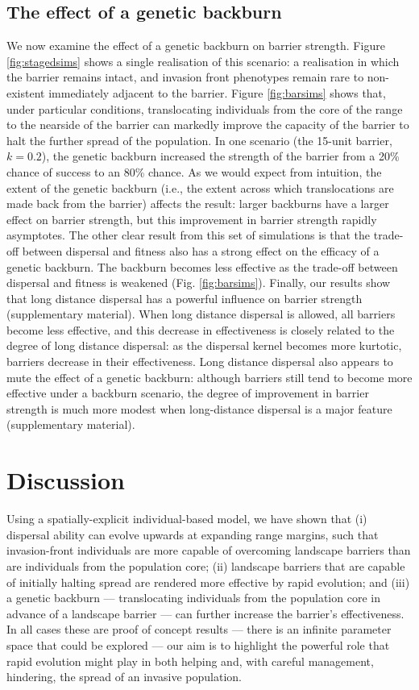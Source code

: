 \documentclass{article}
\begin{document}
\subsection{The effect of a genetic backburn}
We now examine the effect of a genetic backburn on barrier strength.  Figure \ref{fig:stagedsims} shows a single realisation of this scenario: a realisation in which the barrier remains intact, and invasion front phenotypes remain rare to non-existent immediately adjacent to the barrier.  Figure \ref{fig:barsims} shows that, under particular conditions, translocating individuals from the core of the range to the nearside of the barrier can markedly improve the capacity of the barrier to halt the further spread of the population. In one scenario (the 15-unit barrier, $k=0.2$), the genetic backburn increased the strength of the barrier from a 20\% chance of success to an 80\% chance.  As we would expect from intuition, the extent of the genetic backburn (i.e., the extent across which translocations are made back from the barrier) affects the result: larger backburns have a larger effect on barrier strength, but this improvement in barrier strength rapidly asymptotes.  The other clear result from this set of simulations is that the trade-off between dispersal and fitness also has a strong effect on the efficacy of a genetic backburn.  The backburn becomes less effective as the trade-off between dispersal and fitness is weakened (Fig. \ref{fig:barsims}).  Finally, our results show that long distance dispersal has a powerful influence on barrier strength (supplementary material).  When long distance dispersal is allowed, all barriers become less effective, and this decrease in effectiveness is closely related to the degree of long distance dispersal: as the dispersal kernel becomes more kurtotic, barriers decrease in their effectiveness.  Long distance dispersal also appears to mute the effect of a genetic backburn: although barriers still tend to become more effective under a backburn scenario, the degree of improvement in barrier strength is much more modest when long-distance dispersal is a major feature (supplementary material).

\section{Discussion}

Using a spatially-explicit individual-based model, we have shown that (i) dispersal ability can evolve upwards at expanding range margins, such that invasion-front individuals are more capable of overcoming landscape barriers than are individuals from the population core; (ii) landscape barriers that are capable of initially halting spread are rendered more effective by rapid evolution; and (iii) a genetic backburn --- translocating individuals from the population core in advance of a landscape barrier --- can further increase the barrier's effectiveness. In all cases these are proof of concept results --- there is an infinite parameter space that could be explored --- our aim is to highlight the powerful role that rapid evolution might play in both helping and, with careful management, hindering, the spread of an invasive population.
\end{document}
